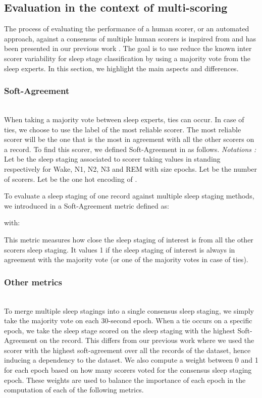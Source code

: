 \documentclass[journal]{IEEEtran}
\begin{document}
\subsection{Evaluation in the context of multi-scoring}
\label{sec:multiscoring}

The process of evaluating the performance of a human scorer, or an automated approach, against a consensus of multiple human scorers is inspired from \cite{Stephansen2018} and has been presented in our previous work \cite{Arnal662734}. The goal is to use reduce the known inter scorer variability for sleep stage classification by using a majority vote from the sleep experts. In this section, we highlight the main aspects and differences.

\newcommand{\varB}[1]{{\operatorname{\mathit{#1}}}}
\subsubsection*{Soft-Agreement}\hfill\\
When taking a majority vote between sleep experts, ties can occur. In case of ties, we choose to use the label of the most reliable scorer. The most reliable scorer will be the one that is the most in agreement with all the other scorers on a record. To find this scorer, we defined Soft-Agreement in \cite{Arnal662734} as follows.
\textit{Notations : }Let  be the sleep staging associated to scorer  taking values in  standing respectively for Wake, N1, N2, N3 and REM with size  epochs. Let  be the number of scorers. Let  be the one hot encoding of .

To evaluate a sleep staging of one record against multiple sleep staging methods, we introduced in \cite{Arnal662734} a Soft-Agreement metric defined as:



with:


This metric measures how close the sleep staging of interest is from all the other scorers sleep staging. It values 1 if the sleep staging of interest is always in agreement with the majority vote (or one of the majority votes in case of ties).

\subsubsection*{Other metrics} \label{explanation_consensus} \hfill\\
To merge multiple sleep stagings into a single consensus sleep staging, we simply take the majority vote on each 30-second epoch. When a tie occurs on a specific epoch, we take the sleep stage scored on the sleep staging with the highest Soft-Agreement on the record. This differs from our previous work \cite{Arnal662734} where we used the scorer with the highest soft-agreement over all the records of the dataset, hence inducing a dependency to the dataset. We also compute a weight between 0 and 1 for each epoch based on how many scorers voted for the consensus sleep staging epoch. These weights are used to balance the importance of each epoch in the computation of each of the following metrics.
\end{document}
